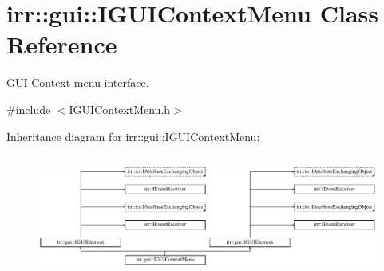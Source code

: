 \hypertarget{classirr_1_1gui_1_1IGUIContextMenu}{}\section{irr\+:\+:gui\+:\+:I\+G\+U\+I\+Context\+Menu Class Reference}
\label{classirr_1_1gui_1_1IGUIContextMenu}


G\+UI Context menu interface.  




{\ttfamily \#include $<$I\+G\+U\+I\+Context\+Menu.\+h$>$}

Inheritance diagram for irr\+:\+:gui\+:\+:I\+G\+U\+I\+Context\+Menu\+:\begin{figure}[H]
\begin{center}
\leavevmode
\includegraphics[height=4.038462cm]{classirr_1_1gui_1_1IGUIContextMenu}
\end{center}
\end{figure}
